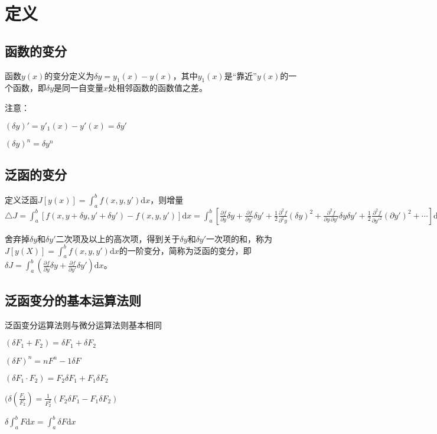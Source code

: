 \documentclass{article}
\begin{document}
\tableofcontents
\section{定义}
\subsection{函数的变分}
函数$y(x)$的变分定义为$\delta y=y_1(x)-y(x)$，其中$y_1(x)$是“靠近”$y(x)$的一个函数，即$\delta y$是同一自变量$x$处相邻函数的函数值之差。

注意：

$(\delta y)'=y'_1(x)-y'(x)=\delta y'$

$(\delta y)^n=\delta y^n $
\subsection{泛函的变分}
定义泛函$J[y(x)]=\int_{a}^{b} f(x,y,y')\mathrm{d}x$，则增量$\bigtriangleup J=\int_{a}^{b}[f(x,y+\delta y,y'+\delta y')-f(x,y,y')]\mathrm{d}x=\int_{a}^{b}[\frac{\partial f}{\partial y}\delta y + \frac{\partial f}{\partial y'}\delta y'+\frac{1}{2}\frac{\partial^2 f}{\partial^2 y}(\delta y)^2+\frac{\partial^2 f}{\partial y\,\partial y'}\delta y\delta y'+\frac{1}{2}\frac{\partial^2 f}{\partial y'^2}(\partial y')^2+\cdots]\mathrm{d}x$

舍弃掉$\delta y$和$\delta y'$二次项及以上的高次项，得到关于$\delta y$和$\delta y'$一次项的和，称为$J[y(X)]=\int_{a}^{b} f(x,y,y')\mathrm{d}x$的一阶变分，简称为泛函的变分，即$\delta J=\int_{a}^{b}(\frac{\partial f}{\partial y}\delta y + \frac{\partial f}{\partial y'}\delta y')\mathrm{d}x$。
\subsection{泛函变分的基本运算法则}
泛函变分运算法则与微分运算法则基本相同

$(\delta F_1 +F_2)=\delta F_1 +\delta F_2$

$(\delta F)^n=nF^n-1\delta F$

$(\delta F_1 \cdot F_2)=F_2\delta F_1+F_1\delta F_2$

$(\delta (\frac{F_1}{F_2})=\frac{1}{F^2_2}(F_2\delta F_1-F_1\delta F_2)$

$\delta\int_{a}^{b}F\mathrm{d}x=\int_{a}^{b}\delta F\mathrm{d}x$
\end{document}
